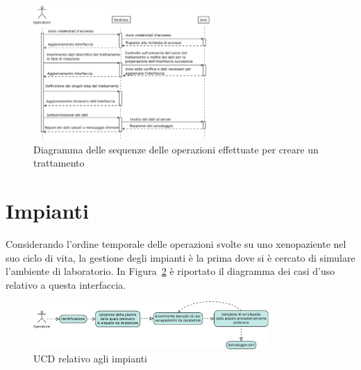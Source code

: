 \begin{figure}[h]
\begin{center}
\includegraphics[width=0.6\textwidth]{./Figure/SDtreatmentsCreate}
\end{center}
\caption{Diagramma delle sequenze delle operazioni effettuate per creare un trattamento\label{fig:SDtreat}}
\end{figure}

\newpage

\section{Impianti}

Considerando l'ordine temporale delle operazioni svolte su uno xenopaziente nel suo ciclo di vita, la gestione degli impianti \`e la prima dove si \`e cercato di simulare l'ambiente di laboratorio. In Figura~\ref{fig:UCDimpl} \`e riportato il diagramma dei casi d'uso relativo a questa interfaccia.

\begin{figure}[h]
\begin{center}
\includegraphics[width=0.8\textwidth]{./Figure/UCDimplants}
\end{center}
\caption{UCD relativo agli impianti\label{fig:UCDimpl}}
\end{figure}

